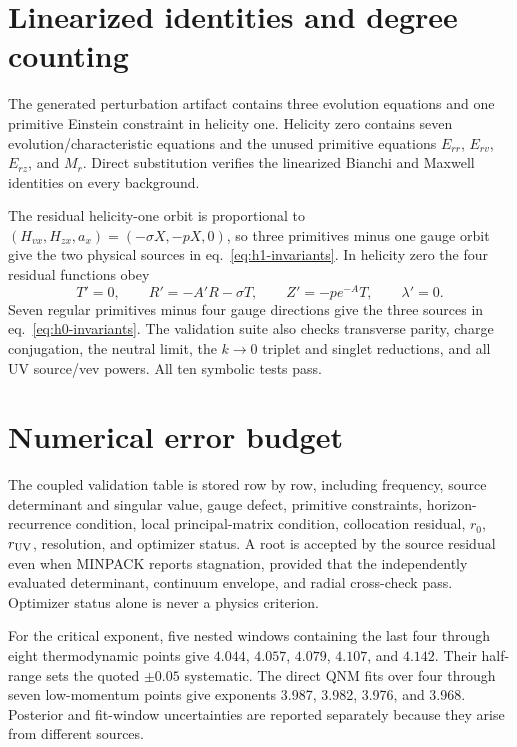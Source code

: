 \documentclass[11pt,a4paper]{article}
\begin{document}
\appendix

\section{Linearized identities and degree counting}
\label{app:identities}

The generated perturbation artifact contains three evolution equations and
one primitive Einstein constraint in helicity one.  Helicity zero contains
seven evolution/characteristic equations and the unused primitive equations
$E_{rr}$, $E_{rv}$, $E_{rz}$, and $M_r$.  Direct substitution verifies the
linearized Bianchi and Maxwell identities on every background.

The residual helicity-one orbit is proportional to
$(H_{vx},H_{zx},a_x)=(-\sigma X,-pX,0)$, so three primitives minus one gauge
orbit give the two physical sources in eq.~\eqref{eq:h1-invariants}.  In
helicity zero the four residual functions obey
\begin{equation}
 T'=0,\qquad R'=-A'R-\sigma T,\qquad
 Z'=-p e^{-A}T,\qquad \lambda'=0.
\end{equation}
Seven regular primitives minus four gauge directions give the three sources
in eq.~\eqref{eq:h0-invariants}.  The validation suite also checks transverse
parity, charge conjugation, the neutral limit, the $k\to0$ triplet and singlet
reductions, and all UV source/vev powers.  All ten symbolic tests pass.

\section{Numerical error budget}
\label{app:error-budget}

The coupled validation table is stored row by row, including frequency,
source determinant and singular value, gauge defect, primitive constraints,
horizon-recurrence condition, local principal-matrix condition, collocation
residual, $r_0$, $r_{\rm UV}$, resolution, and optimizer status.  A root is
accepted by the source residual even when MINPACK reports stagnation, provided
that the independently evaluated determinant, continuum envelope, and radial
cross-check pass.  Optimizer status alone is never a physics criterion.

For the critical exponent, five nested windows containing the last four
through eight thermodynamic points give $4.044$, $4.057$, $4.079$, $4.107$,
and $4.142$.  Their half-range sets the quoted $\pm0.05$ systematic.  The
direct QNM fits over four through seven low-momentum points give exponents
3.987, 3.982, 3.976, and 3.968.  Posterior and fit-window uncertainties are
reported separately because they arise from different sources.
\end{document}
